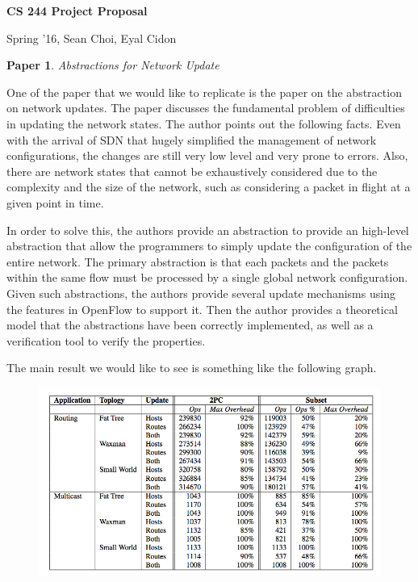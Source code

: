 \documentclass[11pt]{article}
\title{}
\author{}
\date{}
\newtheorem{pb}{Paper}
\begin{document}
\begin{flushleft}
\textbf{\Large{CS 244 Project Proposal}}
\begin{flushright} Spring '16, Sean Choi, Eyal Cidon
\end{flushright}
\end{flushleft}

\begin{pb}
Abstractions for Network Update
\end{pb}
One of the paper that we would like to replicate is the paper on the abstraction on network updates. The paper discusses the fundamental problem of difficulties in updating the network states. The author points out the following facts. Even with the arrival of SDN that hugely simplified the management of network configurations, the changes are still very low level and very prone to errors. Also, there are network states that cannot be exhaustively considered due to the complexity and the size of the network, such as considering a packet in flight at a given point in time.

In order to solve this, the authors provide an abstraction to provide an high-level abstraction that allow the programmers to simply update the configuration of the entire network. The primary abstraction is that each packets and the packets within the same flow must be processed by a single global network configuration. Given such abstractions, the authors provide several update mechanisms using the features in OpenFlow to support it. Then the author provides a theoretical model that the abstractions have been correctly implemented, as well as a verification tool to verify the properties. 

The main result we would like to see is something like the following graph.
\begin{figure}[H]
\includegraphics[width=16cm]{table}
\centering
\end{figure}
\end{document}
